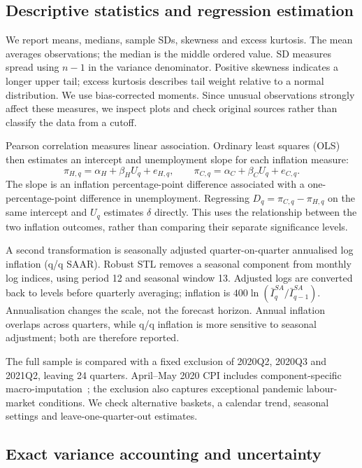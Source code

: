 \documentclass[10pt,a4paper]{article}
\begin{document}
\clearpage
\subsection{Descriptive statistics and regression estimation}

We report means, medians, sample SDs, skewness and excess kurtosis. The mean averages observations; the median is the middle ordered value. SD measures spread using $n-1$ in the variance denominator. Positive skewness indicates a longer upper tail; excess kurtosis describes tail weight relative to a normal distribution. We use bias-corrected moments. Since unusual observations strongly affect these measures, we inspect plots and check original sources rather than classify the data from a cutoff.

Pearson correlation measures linear association. Ordinary least squares (OLS) then estimates an intercept and unemployment slope for each inflation measure:
\begin{equation}
\pi_{H,q}=\alpha_H+\beta_H U_q+e_{H,q},\qquad
\pi_{C,q}=\alpha_C+\beta_C U_q+e_{C,q}.
\label{eq:reg}
\end{equation}
The slope is an inflation percentage-point difference associated with a one-percentage-point difference in unemployment. Regressing $D_q=\pi_{C,q}-\pi_{H,q}$ on the same intercept and $U_q$ estimates $\delta$ directly. This uses the relationship between the two inflation outcomes, rather than comparing their separate significance levels.

A second transformation is seasonally adjusted quarter-on-quarter annualised log inflation (q/q SAAR). Robust STL removes a seasonal component from monthly log indices, using period 12 and seasonal window 13. Adjusted logs are converted back to levels before quarterly averaging; inflation is $400\ln(\bar I_q^{SA}/\bar I_{q-1}^{SA})$. Annualisation changes the scale, not the forecast horizon. Annual inflation overlaps across quarters, while q/q inflation is more sensitive to seasonal adjustment; both are therefore reported.

The full sample is compared with a fixed exclusion of 2020Q2, 2020Q3 and 2021Q2, leaving 24 quarters. April--May 2020 CPI includes component-specific macro-imputation~\cite{imputation}; the exclusion also captures exceptional pandemic labour-market conditions. We check alternative baskets, a calendar trend, seasonal settings and leave-one-quarter-out estimates.

\subsection{Exact variance accounting and uncertainty}
\end{document}
